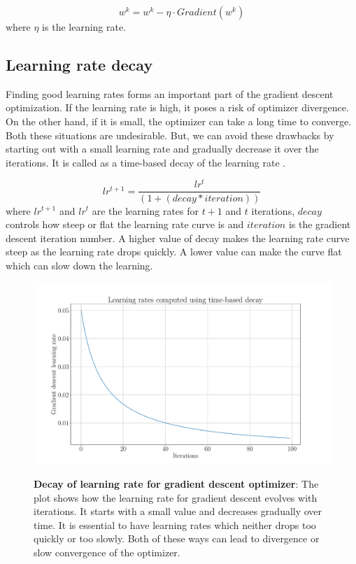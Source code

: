 \begin{equation}
w^k = w^k - \eta \cdot {Gradient(w^k)}
\end{equation}
where $\eta$ is the learning rate.

\subsection{Learning rate decay}
Finding good learning rates forms an important part of the gradient descent optimization. If the learning rate is high, it poses a risk of optimizer divergence. On the other hand, if it is small, the optimizer can take a long time to converge. Both these situations are undesirable. But, we can avoid these drawbacks by starting out with a small learning rate and gradually decrease it over the iterations. It is called as a time-based decay of the learning rate \cite{articleRuderS}.

\begin{equation}
lr^{t+1} = \frac{lr^t}{( 1 + ( decay * iteration ) )}
\end{equation}
where $lr^{t+1}$ and $lr^t$ are the learning rates for $t+1$ and $t$ iterations, $decay$ controls how steep or flat the learning rate curve is and $iteration$ is the gradient descent iteration number. A higher value of decay makes the learning rate curve steep as the learning rate drops quickly. A lower value can make the curve flat which can slow down the learning.

\begin{figure}[h]
\begin{centering}
    {\includegraphics[scale=0.37]{figures/Learning_rates.pdf}}
    \caption[Decay of learning rate for gradient descent optimizer]{\textbf{Decay of learning rate for gradient descent optimizer}: The plot shows how the learning rate for gradient descent evolves with iterations. It starts with a small value and decreases gradually over time. It is essential to have learning rates which neither drops too quickly or too slowly. Both of these ways can lead to divergence or slow convergence of the optimizer.}
\end{centering}
\end{figure}

